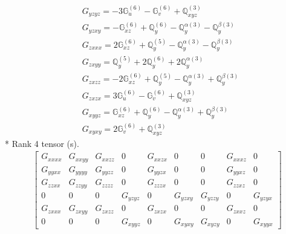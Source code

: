 \documentclass[fleqn,8pt,landscape]{jsarticle}
\begin{document}
\begin{align*}
& G_{yzyz} = - 3 \mathbb{G}_{u}^{(6)} - \mathbb{G}_{v}^{(6)} + \mathbb{Q}_{xyz}^{(3)} \\
& G_{yzxy} = - \mathbb{G}_{xz}^{(6)} + \mathbb{Q}_{y}^{(6)} - \mathbb{Q}_{y}^{\alpha(3)} - \mathbb{Q}_{y}^{\beta(3)} \\
& G_{zxxx} = 2 \mathbb{G}_{xz}^{(6)} + \mathbb{Q}_{y}^{(5)} - \mathbb{Q}_{y}^{\alpha(3)} - \mathbb{Q}_{y}^{\beta(3)} \\
& G_{zxyy} = \mathbb{Q}_{y}^{(5)} + 2 \mathbb{Q}_{y}^{(6)} + 2 \mathbb{Q}_{y}^{\alpha(3)} \\
& G_{zxzz} = - 2 \mathbb{G}_{xz}^{(6)} + \mathbb{Q}_{y}^{(5)} - \mathbb{Q}_{y}^{\alpha(3)} + \mathbb{Q}_{y}^{\beta(3)} \\
& G_{zxzx} = 3 \mathbb{G}_{u}^{(6)} - \mathbb{G}_{v}^{(6)} + \mathbb{Q}_{xyz}^{(3)} \\
& G_{xyyz} = \mathbb{G}_{xz}^{(6)} + \mathbb{Q}_{y}^{(6)} - \mathbb{Q}_{y}^{\alpha(3)} + \mathbb{Q}_{y}^{\beta(3)} \\
& G_{xyxy} = 2 \mathbb{G}_{v}^{(6)} + \mathbb{Q}_{xyz}^{(3)}
\end{align*}
* Rank 4 tensor (s).
\begin{align*}
\begin{bmatrix} G_{xxxx} & G_{xxyy} & G_{xxzz} & 0 & G_{xxzx} & 0 & 0 & G_{xxxz} & 0 \\ G_{yyxx} & G_{yyyy} & G_{yyzz} & 0 & G_{yyzx} & 0 & 0 & G_{yyxz} & 0 \\ G_{zzxx} & G_{zzyy} & G_{zzzz} & 0 & G_{zzzx} & 0 & 0 & G_{zzxz} & 0 \\ 0 & 0 & 0 & G_{yzyz} & 0 & G_{yzxy} & G_{yzzy} & 0 & G_{yzyx} \\ G_{zxxx} & G_{zxyy} & G_{zxzz} & 0 & G_{zxzx} & 0 & 0 & G_{zxxz} & 0 \\ 0 & 0 & 0 & G_{xyyz} & 0 & G_{xyxy} & G_{xyzy} & 0 & G_{xyyx} \end{bmatrix}
\end{align*}
\end{document}
